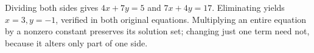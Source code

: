 Dividing both sides gives $4x+7y=5$ and $7x+4y=17$. Eliminating yields $x=3,y=-1$, verified in both original equations. Multiplying an entire equation by a nonzero constant preserves its solution set; changing just one term need not, because it alters only part of one side.
